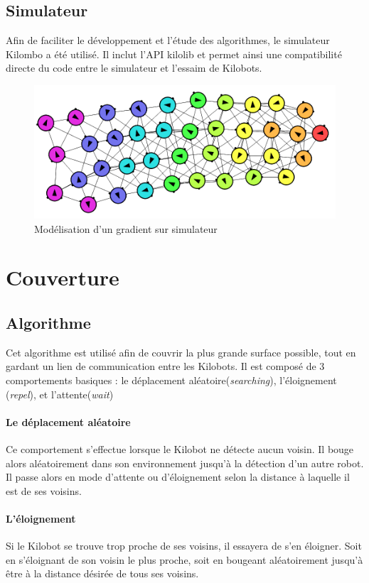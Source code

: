 \documentclass[a4paper]{article}
\begin{document}
\subsection{Simulateur}
Afin de faciliter le développement et l'étude des algorithmes, le simulateur Kilombo \cite{jansson_kilombo:_2015} a été utilisé. Il inclut l'API kilolib et permet ainsi une compatibilité directe du code entre le simulateur et l'essaim de Kilobots.
\begin{figure}[h!]
	\begin{center}
		\centering
		\includegraphics[width=0.8\linewidth]{../../script_results/gradient2-sim.png}
		\caption{Modélisation  d'un gradient sur simulateur}
	\end{center}
\end{figure} 
\newpage
\section{Couverture}
\subsection{Algorithme}
Cet algorithme est utilisé afin de couvrir la plus grande surface possible, tout en gardant un lien de communication entre les Kilobots.
Il est composé de 3 comportements basiques : le déplacement aléatoire(\textit{searching}), l'éloignement (\textit{repel}),  et l'attente(\textit{wait})
\paragraph{Le déplacement aléatoire} Ce comportement s'effectue lorsque le Kilobot ne détecte aucun voisin. Il bouge alors aléatoirement dans son environnement jusqu'à la détection d'un autre robot. Il passe alors en mode d'attente ou d'éloignement selon la distance à laquelle il est de ses voisins.
\paragraph{L'éloignement} Si le Kilobot se trouve trop proche de ses voisins, il essayera de s'en éloigner. Soit en s'éloignant de son voisin le plus proche, soit en bougeant aléatoirement jusqu'à être à la distance désirée de tous ses voisins.
\end{document}
